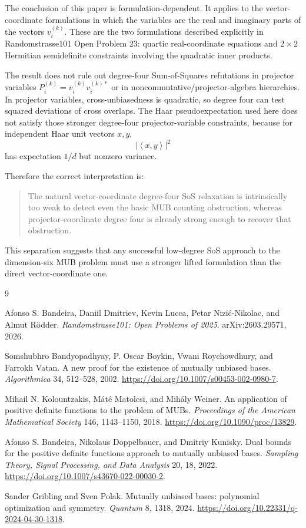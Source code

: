 \documentclass[11pt]{article}
\theoremstyle{remark}
\newcommand{\ip}[2]{\left\langle #1,#2\right\rangle}
\begin{document}
The conclusion of this paper is formulation-dependent. It applies to the vector-coordinate formulations in which the variables are the real and imaginary parts of the vectors $v_i^{(k)}$. These are the two formulations described explicitly in Randomstrasse101 Open Problem 23: quartic real-coordinate equations and $2\times2$ Hermitian semidefinite constraints involving the quadratic inner products.

The result does not rule out degree-four Sum-of-Squares refutations in projector variables $P_i^{(k)}=v_i^{(k)}v_i^{(k)*}$ or in noncommutative/projector-algebra hierarchies. In projector variables, cross-unbiasedness is quadratic, so degree four can test squared deviations of cross overlaps. The Haar pseudoexpectation used here does not satisfy those stronger degree-four projector-variable constraints, because for independent Haar unit vectors $x,y$,
\[
|\ip{x}{y}|^2
\]
has expectation $1/d$ but nonzero variance.

Therefore the correct interpretation is:
\begin{quote}
The natural vector-coordinate degree-four SoS relaxation is intrinsically too weak to detect even the basic MUB counting obstruction, whereas projector-coordinate degree four is already strong enough to recover that obstruction.
\end{quote}

This separation suggests that any successful low-degree SoS approach to the dimension-six MUB problem must use a stronger lifted formulation than the direct vector-coordinate one.

\begin{thebibliography}{9}

Afonso S. Bandeira, Daniil Dmitriev, Kevin Lucca, Petar Nizi\'c-Nikolac, and Almut R\"odder.
\newblock \emph{Randomstrasse101: Open Problems of 2025}.
\newblock arXiv:2603.29571, 2026.

Somshubhro Bandyopadhyay, P. Oscar Boykin, Vwani Roychowdhury, and Farrokh Vatan.
\newblock A new proof for the existence of mutually unbiased bases.
\newblock \emph{Algorithmica} 34, 512--528, 2002.
\newblock \url{https://doi.org/10.1007/s00453-002-0980-7}.

Mihail N. Kolountzakis, M\'at\'e Matolcsi, and Mih\'aly Weiner.
\newblock An application of positive definite functions to the problem of MUBs.
\newblock \emph{Proceedings of the American Mathematical Society} 146, 1143--1150, 2018.
\newblock \url{https://doi.org/10.1090/proc/13829}.

Afonso S. Bandeira, Nikolaus Doppelbauer, and Dmitriy Kunisky.
\newblock Dual bounds for the positive definite functions approach to mutually unbiased bases.
\newblock \emph{Sampling Theory, Signal Processing, and Data Analysis} 20, 18, 2022.
\newblock \url{https://doi.org/10.1007/s43670-022-00030-2}.

Sander Gribling and Sven Polak.
\newblock Mutually unbiased bases: polynomial optimization and symmetry.
\newblock \emph{Quantum} 8, 1318, 2024.
\newblock \url{https://doi.org/10.22331/q-2024-04-30-1318}.

\end{thebibliography}
\end{document}
